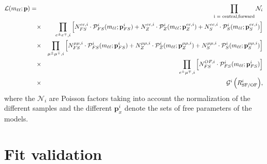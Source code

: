 \begin{eqnarray*}
{\mathcal{L}}(m_{\ell\ell};\mathbf{p}) =&&   \prod_{\text{i = central,forward}} \mathcal{N}_i\\
                        &\times& \prod_{\EE,i}\left[N_{FS}^{ee,i} \cdot {\mathcal{P}}_{FS}^i(m_{\ell\ell};\mathbf{p}_{FS}^i) %
                                                  + N_{Z}^{ee,i} \cdot {\mathcal{P}}_{Z}^i(m_{\ell\ell};\mathbf{p}_{Z}^{ee,i}) %
                                                  + N_{S}^{ee,i} \cdot {\mathcal{P}}_{S}^i(m_{\ell\ell};\mathbf{p}_{S}^{ee,i})\right] \\
                        &\times& \prod_{\MM,i}\left[N_{FS}^{\mu\mu,i} \cdot {\mathcal{P}}_{FS}^i(m_{\ell\ell};\mathbf{p}_{FS}^i) %
                                                  + N_{Z}^{\mu\mu,i} \cdot {\mathcal{P}}_{Z}^i(m_{\ell\ell};\mathbf{p}_{Z}^{\mu\mu,i}) %
                                                  + N_{S}^{\mu\mu,i} \cdot {\mathcal{P}}_{S}^i(m_{\ell\ell};\mathbf{p}_{S}^{\mu\mu,i})\right] \\
                        &\times& \prod_{\EM,i}\left[N_{FS}^{OF,i} \cdot {\mathcal{P}}_{FS}^i(m_{\ell\ell};\mathbf{p}_{FS}^i)\right] \\   
                        &\times& {\mathcal{G}^i\left(\Rsfof^i\right)}, \\
\end{eqnarray*}
where the $\mathcal{N}_i$ are Poisson factors taking into account the normalization of the different samples and the different $\mathbf{p}^i_{x}$ denote the sets of free parameters of the models. 


\section{Fit validation}

